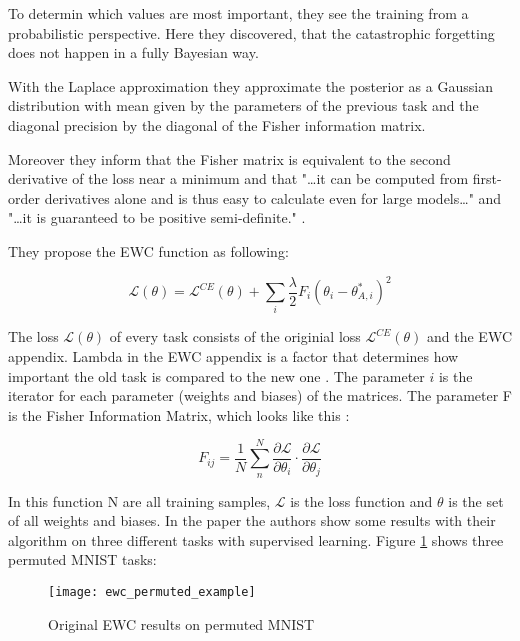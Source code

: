 To determin which values are most important, they see the training from a probabilistic perspective.
Here they discovered, that the catastrophic forgetting does not happen in a fully Bayesian way.
\cite{elastic-weight-consolidation}

With the Laplace approximation they approximate the posterior as a Gaussian distribution with mean given by the parameters of the previous task and the diagonal precision by the diagonal of the Fisher information matrix.
\cite{elastic-weight-consolidation}

Moreover they inform that the Fisher matrix is equivalent to the second derivative of the loss near a minimum and that "…it can be computed from first-order derivatives alone and is thus easy to calculate even for large models…" \cite{elastic-weight-consolidation} and "…it is guaranteed to be positive semi-definite."
\cite{elastic-weight-consolidation}.
\cite{elastic-weight-consolidation}

They propose the EWC function as following:

$$\mathcal{L}(\theta) = \mathcal{L}^{CE}(\theta) + \sum_{i} \frac{\lambda}{2} F_{i} (\theta_{i} - 
\theta_{A,i}^{*})^2 $$

The loss $\mathcal{L}(\theta)$ of every task consists of the originial loss $\mathcal{L}^{CE}(\theta)$ and the EWC appendix.
Lambda in the EWC appendix is a factor that determines how important the old task is compared to the new one \cite{elastic-weight-consolidation}.
The parameter $i$ is the iterator for each parameter (weights and biases) of the matrices.
The parameter F is the Fisher Information Matrix, which looks like this \cite{incrmental-moment-matching}:

$$F_{ij} = \frac{1}{N} \sum_{n}^{N} \frac{\partial \mathcal{L}}{\partial \theta_{i}} \cdot \frac{\partial \mathcal{L}}{\partial \theta_{j}}$$

In this function N are all training samples, $\mathcal{L}$ is the loss function and $\theta$ is the set of all weights and biases.
In the paper the authors show some results with their algorithm on three different tasks with supervised learning. Figure \ref{fig:ewc_permuted_example} shows three permuted MNIST tasks:
\begin{figure}[H]
    \centering
    \texttt{[image: ewc\_permuted\_example]}
    \caption{\cite{elastic-weight-consolidation} Original EWC results on permuted MNIST}
    \label{fig:ewc_permuted_example}
\end{figure}